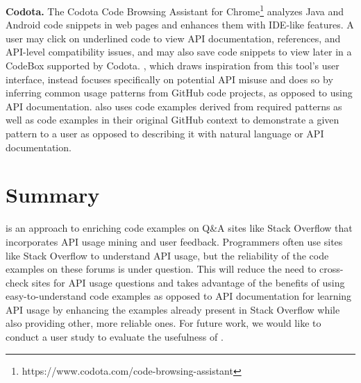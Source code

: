{\bf Codota.} The Codota Code Browsing Assistant for Chrome\footnote{https://www.codota.com/code-browsing-assistant} analyzes Java and Android code snippets in web pages and enhances them with IDE-like features. A user may click on underlined code to view API documentation, references, and API-level compatibility issues, and may also save code snippets to view later in a CodeBox supported by Codota. {\soa}, which draws inspiration from this tool's user interface, instead focuses specifically on potential API misuse and does so by inferring common usage patterns from GitHub code projects, as opposed to using API documentation. {\soa} also uses code examples derived from required patterns as well as code examples in their original GitHub context to demonstrate a given pattern to a user as opposed to describing it with natural language or API documentation.

\section{Summary}
\label{sec:summary}

{\soa} is an approach to enriching code examples on Q\&A sites like Stack Overflow that incorporates API usage mining and user feedback. Programmers often use sites like Stack Overflow to understand API usage, but the reliability of the code examples on these forums is under question. This will reduce the need to cross-check sites for API usage questions and takes advantage of the benefits of using easy-to-understand code examples as opposed to API documentation for learning API usage by enhancing the examples already present in Stack Overflow while also providing other, more reliable ones. For future work, we would like to conduct a user study to evaluate the usefulness of {\tool}.